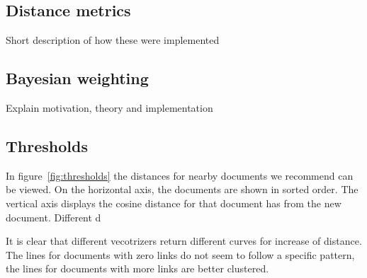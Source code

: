 \subsection{Distance metrics}
Short description of how these were implemented

\subsection{Bayesian weighting}
Explain motivation, theory and implementation 

\subsection{Thresholds}
In figure~\ref{fig:thresholds} the distances for nearby documents we recommend can be viewed. On the horizontal axis, the documents are shown in sorted order.  The vertical axis displays the cosine distance for that document has from the new document. Different d

It is clear that different vecotrizers return different curves for  increase of distance. The lines for documents with zero links do not seem to follow a specific pattern, the lines for documents with more links are better clustered. 



